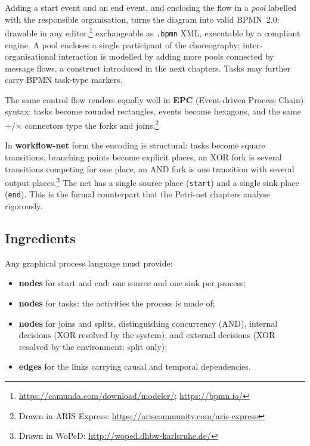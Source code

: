 Adding a start event and an end event, and enclosing the flow in a \emph{pool} labelled with the responsible organisation, turns the diagram into valid BPMN~2.0: drawable in any editor,\footnote{\url{https://camunda.com/download/modeler/}; \url{https://bpmn.io/}} exchangeable as \texttt{.bpmn} XML, executable by a compliant engine. A pool encloses a single participant of the choreography; inter-organisational interaction is modelled by adding more pools connected by message flows, a construct introduced in the next chapters. Tasks may further carry BPMN task-type markers.

The same control flow renders equally well in \textbf{EPC} (Event-driven Process Chain) syntax: tasks become rounded rectangles, events become hexagons, and the same $+$/$\times$ connectors type the forks and joins.\footnote{Drawn in ARIS Express: \url{https://ariscommunity.com/aris-express}}

In \textbf{workflow-net} form the encoding is structural: tasks become square transitions, branching points become explicit places, an XOR fork is several transitions competing for one place, an AND fork is one transition with several output places.\footnote{Drawn in WoPeD: \url{http://woped.dhbw-karlsruhe.de/}} The net has a single source place (\texttt{start}) and a single sink place (\texttt{end}). This is the formal counterpart that the Petri-net chapters analyse rigorously.

\subsection{Ingredients}

Any graphical process language must provide:

\begin{itemize}
  \item \textbf{nodes} for start and end: one source and one sink per process;
  \item \textbf{nodes} for tasks: the activities the process is made of;
  \item \textbf{nodes} for joins and splits, distinguishing concurrency (AND), internal decisions (XOR resolved by the system), and external decisions (XOR resolved by the environment: split only);
  \item \textbf{edges} for the links carrying causal and temporal dependencies.
\end{itemize}

